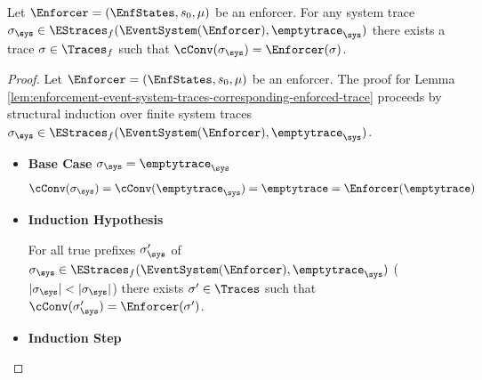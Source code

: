 \begin{lemma}
    \label{lem:enforcement-event-system-traces-corresponding-enforced-trace}
    Let $\Enforcer = (\EnfStates, s_0, \mu)$ be an enforcer.
    For any system trace
    $\sigma_\sys \in \EStraces_f(\EventSystem(\Enforcer), \emptytrace_\sys)$
    there exists a trace $\sigma \in \Traces_f$ such that
    $\cConv(\sigma_\sys) = \Enforcer(\sigma)$.
\end{lemma}

\begin{proof}
    \label{proof:enforcement-event-system-traces-corresponding-enforced-trace}
    Let $\Enforcer = (\EnfStates, s_0, \mu)$ be an enforcer.
    The proof for Lemma
    \ref{lem:enforcement-event-system-traces-corresponding-enforced-trace}
    proceeds by structural induction over finite system traces
    $\sigma_\sys \in \EStraces_f(\EventSystem(\Enforcer), \emptytrace_\sys)$.
    \begin{itemize}
        \item \textbf{Base Case} $\sigma_\sys = \emptytrace_\sys$
        \begin{align*}
            \cConv(\sigma_\sys)
            = \cConv(\emptytrace_\sys) 
            = \emptytrace
            = \Enforcer(\emptytrace)
        \end{align*}
        
        \item \textbf{Induction Hypothesis}

        For all true prefixes $\sigma_\sys'$ of
        $\sigma_\sys \in \EStraces_f(\EventSystem(\Enforcer), \emptytrace_\sys)$
        ($|\sigma_\sys| < |\sigma_\sys|$)
        there exists $\sigma' \in \Traces$ such that
        $\cConv(\sigma_\sys') = \Enforcer(\sigma')$.

        \item \textbf{Induction Step}


\end{itemize}
\end{proof}

